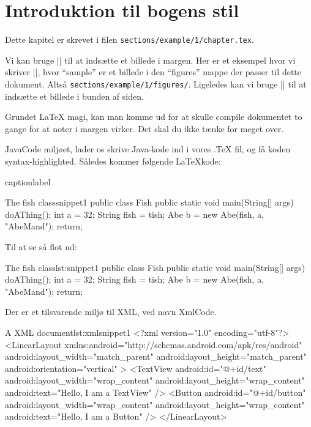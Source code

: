 \chapter{Introduktion til bogens stil}
Dette kapitel er skrevet i filen \texttt{sections/example/1/chapter.tex}.

\vspace{5mm}

Vi kan bruge \LaTeXInline|| til at 
indsætte et billede i margen. Her er et eksempel hvor vi skriver 
\LaTeXInline||, hvor 
``sample'' er et billede i den ``figures'' mappe der passer til dette dokument. 
Altså \texttt{sections/example/1/figures/}. 
Ligeledes kan vi bruge \LaTeXInline||
til at indsætte et billede i bunden af siden.

Grundet \LaTeX\xspace magi, kan man komme ud for at skulle compile dokumentet 
to gange for at noter i margen virker. Det skal du ikke tænke for meget over.

\clearpage

JavaCode miljøet, lader os skrive Java-kode ind i vores .TeX fil, og få koden 
syntax-highlighted. Således kommer følgende \LaTeX kode:
\begin{LaTeXCode}{caption}{label}
\begin{JavaCode}{The fish class}{snippet1}
	public class Fish {
		public static void main(String[] args) {
			doAThing();
			int a = 32;
			String fish = tish;
			Abe b = new Abe(fish, a, "AbeMand");
			return;
		}
	}
\end{JavaCode}
\end{LaTeXCode}
Til at se så flot ud:
\begin{JavaCode}{The fish class}{lst:snippet1}
	public class Fish {
		public static void main(String[] args) {
			doAThing();
			int a = 32;
			String fish = tish;
			Abe b = new Abe(fish, a, "AbeMand");
			return;
		}
	}
\end{JavaCode}

Der er et tilsvarende miljø til XML, ved navn XmlCode.
\begin{XmlCode}{A XML document}{lst:xmlsnippet1}
	<?xml version="1.0" encoding="utf-8"?>
	<LinearLayout 
		xmlns:android="http://schemas.android.com/apk/res/android"
		android:layout_width="match_parent"
		android:layout_height="match_parent"
		android:orientation="vertical" >
		<TextView android:id="@+id/text"
			android:layout_width="wrap_content"
			android:layout_height="wrap_content"
			android:text="Hello, I am a TextView" />
		<Button android:id="@+id/button"
			android:layout_width="wrap_content"
			android:layout_height="wrap_content"
			android:text="Hello, I am a Button" />
	</LinearLayout>
\end{XmlCode}

